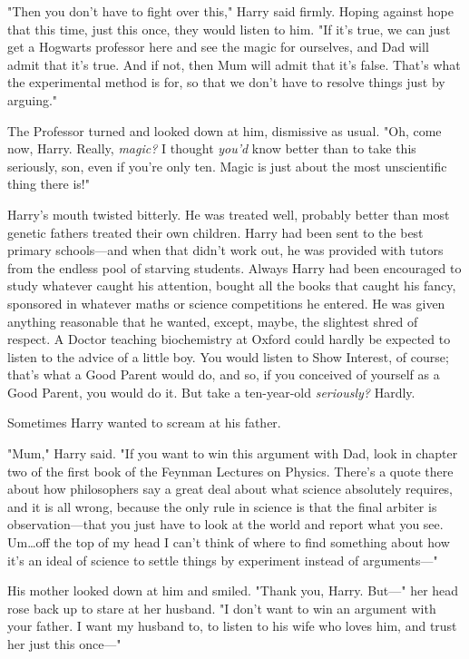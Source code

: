 "Then you don't have to fight over this," Harry said firmly. Hoping against
hope that this time, just this once, they would listen to him. "If it's true,
we can just get a Hogwarts professor here and see the magic for ourselves, and
Dad will admit that it's true. And if not, then Mum will admit that it's false.
That's what the experimental method is for, so that we don't have to resolve
things just by arguing."

The Professor turned and looked down at him, dismissive as usual. "Oh, come
now, Harry. Really, \emph{magic?} I thought \emph{you'd} know better than to
take this seriously, son, even if you're only ten. Magic is just about the most
unscientific thing there is!"

Harry's mouth twisted bitterly. He was treated well, probably better than most
genetic fathers treated their own children. Harry had been sent to the best
primary schools—and when that didn't work out, he was provided with tutors
from the endless pool of starving students. Always Harry had been encouraged to
study whatever caught his attention, bought all the books that caught his
fancy, sponsored in whatever maths or science competitions he entered. He was
given anything reasonable that he wanted, except, maybe, the slightest shred of
respect. A Doctor teaching biochemistry at Oxford could hardly be expected to
listen to the advice of a little boy. You would listen to Show Interest, of
course; that's what a Good Parent would do, and so, if you conceived of
yourself as a Good Parent, you would do it. But take a ten-year-old
\emph{seriously?} Hardly.

Sometimes Harry wanted to scream at his father.

"Mum," Harry said. "If you want to win this argument with Dad, look in chapter
two of the first book of the Feynman Lectures on Physics. There's a quote there
about how philosophers say a great deal about what science absolutely requires,
and it is all wrong, because the only rule in science is that the final arbiter
is observation—that you just have to look at the world and report what you
see. Um…off the top of my head I can't think of where to find something
about how it's an ideal of science to settle things by experiment instead of
arguments—"

His mother looked down at him and smiled. "Thank you, Harry. But—" her head
rose back up to stare at her husband. "I don't want to win an argument with
your father. I want my husband to, to listen to his wife who loves him, and
trust her just this once—"

